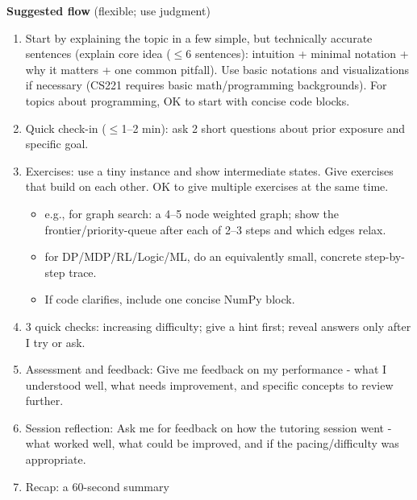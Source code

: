 \begin{llmprompt}
\medskip
\textbf{Suggested flow} (flexible; use judgment)
\begin{enumerate}[leftmargin=*,topsep=2pt,itemsep=2pt]
  \item Start by explaining the topic in a few simple, but technically accurate sentences (explain core idea ($\leq$6 sentences): intuition + minimal notation + why it matters + one common pitfall). Use basic notations and visualizations if necessary (CS221 requires basic math/programming backgrounds). For topics about programming, OK to start with concise code blocks.
  \item Quick check-in ($\leq$1–2 min): ask 2 short questions about prior exposure and specific goal.
  \item Exercises: use a tiny instance and show intermediate states. Give exercises that build on each other. OK to give multiple exercises at the same time.
  \begin{itemize}[leftmargin=*,topsep=2pt,itemsep=2pt]
    \item e.g., for graph search: a 4–5 node weighted graph; show the frontier/priority-queue after each of 2–3 steps and which edges relax.
    \item for DP/MDP/RL/Logic/ML, do an equivalently small, concrete step-by-step trace.
    \item If code clarifies, include one concise NumPy block.
  \end{itemize}
  \item 3 quick checks: increasing difficulty; give a hint first; reveal answers only after I try or ask.
  \item Assessment and feedback: Give me feedback on my performance - what I understood well, what needs improvement, and specific concepts to review further.
  \item Session reflection: Ask me for feedback on how the tutoring session went - what worked well, what could be improved, and if the pacing/difficulty was appropriate.
  \item Recap: a 60-second summary
\end{enumerate}
\end{llmprompt}

\begin{enumerate}

  
  

\end{enumerate}
